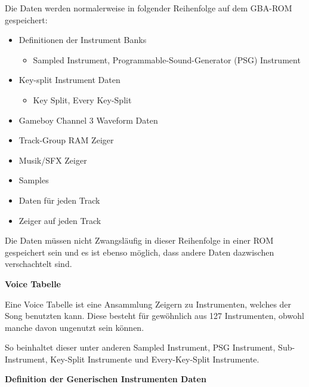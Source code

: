 \documentclass[11pt,a4paper]{scrartcl}
\begin{document}
Die Daten werden normalerweise in folgender Reihenfolge auf dem GBA-ROM gespeichert:
\vspace{15pt}
\begin{itemize}
\item Definitionen der Instrument Banks
\begin{itemize}
\item Sampled Instrument, Programmable-Sound-Generator (PSG) Instrument
\end{itemize}
\item Key-split Instrument Daten
\begin{itemize}
\item Key Split, Every Key-Split
\end{itemize}
\item Gameboy Channel 3 Waveform Daten
\item Track-Group RAM Zeiger
\item Musik/SFX Zeiger
\item Samples
\item Daten f\"{u}r jeden Track
\item Zeiger auf jeden Track
\end{itemize}
\vspace{15pt}

Die Daten m\"{u}ssen nicht Zwangsl\"{a}ufig in dieser Reihenfolge in einer ROM gespeichert sein und es ist ebenso m\"{o}glich, dass andere Daten dazwischen verschachtelt sind.

\vspace{15pt}
\textbf{{\large Voice Tabelle}}

Eine Voice Tabelle ist eine Ansammlung Zeigern zu Instrumenten, welches der Song benutzten kann. Diese besteht f\"{u}r gew\"{o}hnlich aus 127 Instrumenten, obwohl manche davon ungenutzt sein k\"{o}nnen. 

So beinhaltet dieser unter anderen Sampled Instrument, PSG Instrument, Sub-Instrument, Key-Split Instrumente und Every-Key-Split Instrumente.

\newpage

\textbf{{\large Definition der Generischen Instrumenten Daten}}
\end{document}
